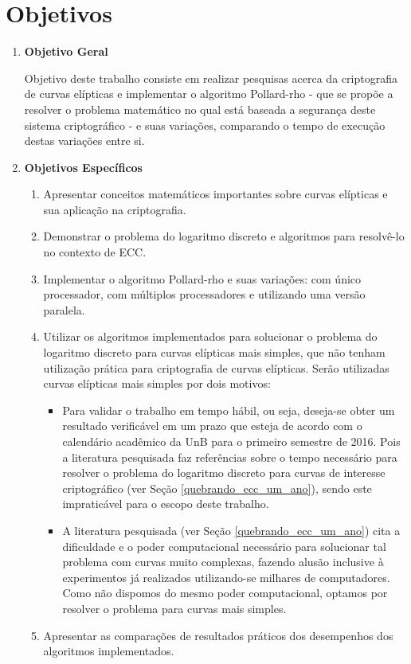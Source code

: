 \section*{Objetivos}
\begin{enumerate}
	\item \textbf{Objetivo Geral}

Objetivo deste trabalho consiste em realizar pesquisas acerca da criptografia de curvas elípticas e implementar o algoritmo Pollard-rho - que se propõe a resolver o problema matemático no qual está baseada a segurança deste sistema criptográfico - e suas variações, comparando o tempo de execução destas variações entre si.

	\item \textbf{Objetivos Específicos}
	\begin{enumerate}
		\item Apresentar conceitos matemáticos importantes sobre curvas elípticas e sua aplicação na criptografia.
		\item Demonstrar o problema do logaritmo discreto e algoritmos para resolvê-lo no contexto de ECC.
		\item Implementar o algoritmo Pollard-rho e suas variações: com único processador, com múltiplos processadores e utilizando uma versão paralela.
		\item Utilizar os algoritmos implementados para solucionar o problema do logaritmo discreto para curvas elípticas mais simples, que não tenham utilização prática para criptografia de curvas elípticas. Serão utilizadas curvas elípticas mais simples por dois motivos:
		\begin{itemize}
			\item Para validar o trabalho em tempo hábil, ou seja, deseja-se obter um resultado verificável em um prazo que esteja de acordo com o calendário acadêmico da UnB para o primeiro semestre de 2016. Pois a literatura pesquisada faz referências sobre o tempo necessário para resolver o problema do logaritmo discreto para curvas de interesse criptográfico (ver Seção \ref{quebrando_ecc_um_ano}), sendo este impraticável para o escopo deste trabalho.
			\item A literatura pesquisada (ver Seção \ref{quebrando_ecc_um_ano}) cita a dificuldade e o poder computacional necessário para solucionar tal problema com curvas muito complexas, fazendo alusão inclusive à experimentos já realizados utilizando-se milhares de computadores. Como não dispomos do mesmo poder computacional, optamos por resolver o problema para curvas mais simples.
		\end{itemize}
		\item Apresentar as comparações de resultados práticos dos desempenhos dos algoritmos implementados.
	\end{enumerate}
\end{enumerate}
